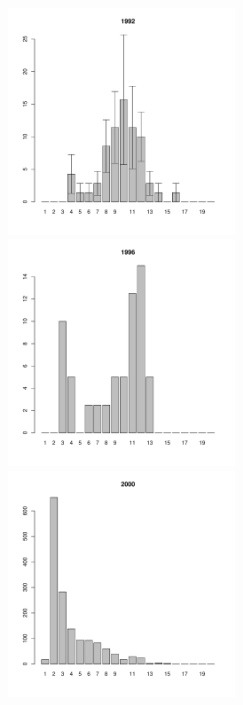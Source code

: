 \documentclass[12pt, a4paper]{article}
\begin{document}
\begin{figure}[h]

\begin{multicols}{3}
\hfill
\includegraphics[width=60mm]{../White_Sea/Luvenga_Goreliy/high_1992_.pdf}
\hfill
\includegraphics[width=60mm]{../White_Sea/Luvenga_Goreliy/high_1996_.pdf}
\hfill
\includegraphics[width=60mm]{../White_Sea/Luvenga_Goreliy/high_2000_.pdf}
\end{multicols}




\end{figure}
\end{document}
